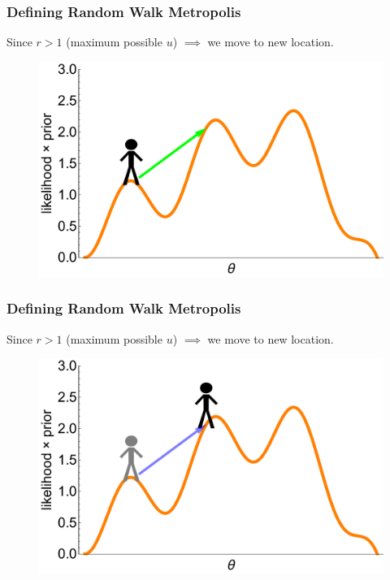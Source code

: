 \documentclass[handout]{beamer}
\begin{document}
\begin{frame}
\frametitle{Defining Random Walk Metropolis}
Since $r > 1$ (maximum possible $u$) $\implies$ we move to new location.

\begin{figure}[ht]
\centerline{\includegraphics[width=1\textwidth]{./Figures/lec4_metropolisDefinition8.pdf}}
\end{figure}

\end{frame}

\begin{frame}
\frametitle{Defining Random Walk Metropolis}
Since $r > 1$ (maximum possible $u$) $\implies$ we move to new location.

\begin{figure}[ht]
\centerline{\includegraphics[width=1\textwidth]{./Figures/lec4_metropolisDefinition9.pdf}}
\end{figure}

\end{frame}
\end{document}
